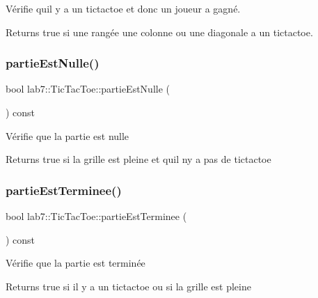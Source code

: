 Vérifie qu\textquotesingle{}il y a un tictactoe et donc un joueur a gagné. \begin{DoxyReturn}{Returns}
true si une rangée une colonne ou une diagonale a un tictactoe. 
\end{DoxyReturn}
\mbox{\label{classlab7_1_1TicTacToe_a278f97c96f7c1e646f16532dd0ac21ae}} 
\subsubsection{\texorpdfstring{partie\+Est\+Nulle()}{partieEstNulle()}}
{\footnotesize\ttfamily bool lab7\+::\+Tic\+Tac\+Toe\+::partie\+Est\+Nulle (\begin{DoxyParamCaption}{ }\end{DoxyParamCaption}) const}

Vérifie que la partie est nulle \begin{DoxyReturn}{Returns}
true si la grille est pleine et qu\textquotesingle{}il n\textquotesingle{}y a pas de tictactoe 
\end{DoxyReturn}
\mbox{\label{classlab7_1_1TicTacToe_a3480fd52c83f0c3631a5686ea5e51d4e}} 
\subsubsection{\texorpdfstring{partie\+Est\+Terminee()}{partieEstTerminee()}}
{\footnotesize\ttfamily bool lab7\+::\+Tic\+Tac\+Toe\+::partie\+Est\+Terminee (\begin{DoxyParamCaption}{ }\end{DoxyParamCaption}) const}

Vérifie que la partie est terminée \begin{DoxyReturn}{Returns}
true si il y a un tictactoe ou si la grille est pleine 
\end{DoxyReturn}
\mbox{\label{classlab7_1_1TicTacToe_adc4d6d6c61aac80e4cc26b995ce72a86}} 
